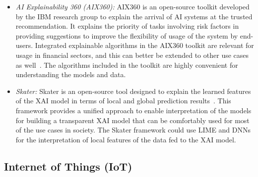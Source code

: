 \documentclass[journal]{IEEEtran}
\begin{document}
\begin{itemize}
    \item \textit{AI Explainability 360 (AIX360):} 
    AIX360 is an open-source toolkit developed by the IBM research group to explain the arrival of AI systems at the trusted recommendation. It explains the priority of tasks involving risk factors in providing suggestions to improve the flexibility of usage of the system by end-users. Integrated explainable algorithms in the AIX360 toolkit are relevant for usage in financial sectors, and this can better be extended to other use cases as well~\cite{arya2020ai}. The algorithms included in the toolkit are highly convenient for understanding the models and data. 
    
    \item \textit{Skater:}
    Skater is an open-source tool designed to explain the learned features of the XAI model in terms of local and global prediction results~\cite{mishra2022model}. This framework provides a unified approach to enable interpretation of the models for building a transparent XAI model that can be comfortably used for most of the use cases in society. The Skater framework could use LIME and DNNs for the interpretation of local features of the data fed to the XAI model.   
    
\end{itemize}
\subsection{Internet of Things (IoT)} 
\end{document}
